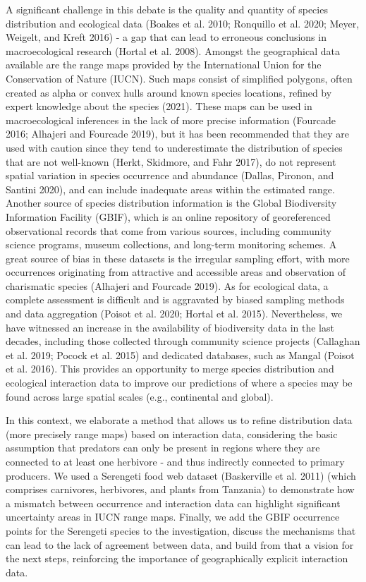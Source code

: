 \documentclass[10pt,oneside]{article}
\begin{document}
A significant challenge in this debate is the quality and quantity of
species distribution and ecological data (Boakes et al. 2010; Ronquillo
et al. 2020; Meyer, Weigelt, and Kreft 2016) - a gap that can lead to
erroneous conclusions in macroecological research (Hortal et al. 2008).
Amongst the geographical data available are the range maps provided by
the International Union for the Conservation of Nature (IUCN). Such maps
consist of simplified polygons, often created as alpha or convex hulls
around known species locations, refined by expert knowledge about the
species (2021). These maps can be used in macroecological inferences in
the lack of more precise information (Fourcade 2016; Alhajeri and
Fourcade 2019), but it has been recommended that they are used with
caution since they tend to underestimate the distribution of species
that are not well-known (Herkt, Skidmore, and Fahr 2017), do not
represent spatial variation in species occurrence and abundance (Dallas,
Pironon, and Santini 2020), and can include inadequate areas within the
estimated range. Another source of species distribution information is
the Global Biodiversity Information Facility (GBIF), which is an online
repository of georeferenced observational records that come from various
sources, including community science programs, museum collections, and
long-term monitoring schemes. A great source of bias in these datasets
is the irregular sampling effort, with more occurrences originating from
attractive and accessible areas and observation of charismatic species
(Alhajeri and Fourcade 2019). As for ecological data, a complete
assessment is difficult and is aggravated by biased sampling methods and
data aggregation (Poisot et al. 2020; Hortal et al. 2015). Nevertheless,
we have witnessed an increase in the availability of biodiversity data
in the last decades, including those collected through community science
projects (Callaghan et al. 2019; Pocock et al. 2015) and dedicated
databases, such as Mangal (Poisot et al. 2016). This provides an
opportunity to merge species distribution and ecological interaction
data to improve our predictions of where a species may be found across
large spatial scales (e.g., continental and global).

In this context, we elaborate a method that allows us to refine
distribution data (more precisely range maps) based on interaction data,
considering the basic assumption that predators can only be present in
regions where they are connected to at least one herbivore - and thus
indirectly connected to primary producers. We used a Serengeti food web
dataset (Baskerville et al. 2011) (which comprises carnivores,
herbivores, and plants from Tanzania) to demonstrate how a mismatch
between occurrence and interaction data can highlight significant
uncertainty areas in IUCN range maps. Finally, we add the GBIF
occurrence points for the Serengeti species to the investigation,
discuss the mechanisms that can lead to the lack of agreement between
data, and build from that a vision for the next steps, reinforcing the
importance of geographically explicit interaction data.
\end{document}
